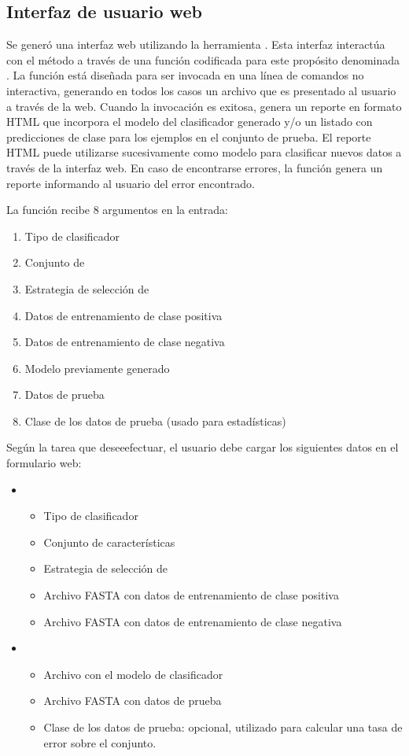 %
%
\subsection{Interfaz de usuario web}
%
Se generó una interfaz web utilizando la herramienta \eng{\webdemo{}}
\cite{webdemobuilder}.
Esta interfaz interactúa con el método a través de una función
codificada para este propósito denominada .
La función está diseñada para ser invocada en una línea de comandos no
interactiva, generando en todos los casos un archivo que es presentado
al usuario a través de la web.
Cuando la invocación es exitosa, genera un reporte en formato HTML que
incorpora el modelo del clasificador generado y/o un listado con
predicciones de clase para los ejemplos en el conjunto de prueba.
El reporte HTML puede utilizarse sucesivamente como modelo para
clasificar nuevos datos a través de la interfaz web.
En caso de encontrarse errores, la función genera un reporte
informando al usuario del error encontrado.

La función  recibe 8 argumentos en la entrada:
%
\begin{enumerate}
\item Tipo de clasificador
\item Conjunto de 
\item Estrategia de selección de 
\item Datos de entrenamiento de clase positiva
\item Datos de entrenamiento de clase negativa
\item Modelo previamente generado
\item Datos de prueba
\item Clase de los datos de prueba (usado para estadísticas)
\end{enumerate}
%

Según la tarea que deseeefectuar, el usuario debe cargar los
siguientes datos en el formulario web:
%
\begin{itemize}
\item
  \begin{itemize}
  \item
    Tipo de clasificador
  \item
    Conjunto de características
  \item
    Estrategia de selección de 
  \item
    Archivo FASTA con datos de entrenamiento de clase positiva
  \item
    Archivo FASTA con datos de entrenamiento de clase negativa
  \end{itemize}
\item
  \begin{itemize}
  \item
    Archivo con el modelo de clasificador
  \item
    Archivo FASTA con datos de prueba
  \item
    Clase de los datos de prueba: opcional, utilizado para calcular
    una tasa de error sobre el conjunto.
  \end{itemize}
\end{itemize}
%
